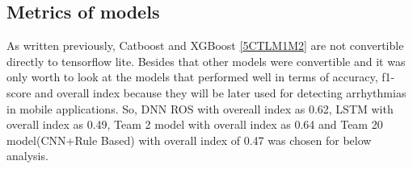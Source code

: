 \subsection{Metrics of models}

As written previously, Catboost and XGBoost \ref{5CTLM1M2} are not convertible directly to tensorflow lite. Besides that other models were convertible and it was only worth to look at the models that performed well in terms of accuracy, f1-score and overall index because they will be later used for detecting arrhythmias in mobile applications. So, DNN ROS with overeall index as 0.62, LSTM with overall index as 0.49, Team 2 model with overall index as 0.64 and Team 20 model(CNN+Rule Based) with overall index of 0.47 was chosen for below analysis. 


\begin{figure}[H]
\\

\end{figure}
